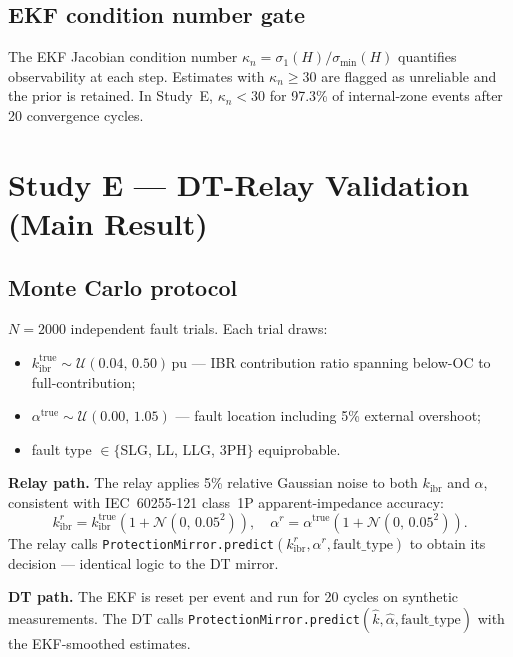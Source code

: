 \documentclass[11pt,a4paper]{article}
\newcommand{\kibr}{k_\mathrm{ibr}}
\newcommand{\kappan}{\kappa_n}
\begin{document}
\subsection{EKF condition number gate}

The EKF Jacobian condition number $\kappan = \sigma_1(H)/\sigma_{\min}(H)$
quantifies observability at each step.  Estimates with $\kappan \geq 30$ are
flagged as unreliable and the prior is retained.  In Study~E, $\kappan < 30$
for 97.3\% of internal-zone events after 20 convergence cycles.

\section{Study E --- DT-Relay Validation (Main Result)}
\label{sec:studyE}

\subsection{Monte Carlo protocol}

$N = 2000$ independent fault trials.  Each trial draws:
\begin{itemize}
  \item $\kibr^\mathrm{true} \sim \mathcal{U}(0.04,\, 0.50)$\,pu —
    IBR contribution ratio spanning below-OC to full-contribution;
  \item $\alpha^\mathrm{true} \sim \mathcal{U}(0.00,\, 1.05)$ —
    fault location including 5\% external overshoot;
  \item fault type $\in \{$SLG, LL, LLG, 3PH$\}$ equiprobable.
\end{itemize}

\noindent\textbf{Relay path.}
The relay applies 5\% relative Gaussian noise to both $\kibr$ and $\alpha$,
consistent with IEC~60255-121 class~1P apparent-impedance accuracy:
\begin{equation}
  \kibr^r = \kibr^\mathrm{true}(1 + \mathcal{N}(0,\,0.05^2)), \quad
  \alpha^r = \alpha^\mathrm{true}(1 + \mathcal{N}(0,\,0.05^2)).
\end{equation}
The relay calls \texttt{ProtectionMirror.predict}$(\kibr^r, \alpha^r,
\text{fault\_type})$ to obtain its decision — identical logic to the DT mirror.

\noindent\textbf{DT path.}
The EKF is reset per event and run for 20 cycles on synthetic measurements.
The DT calls \texttt{ProtectionMirror.predict}$(\hat{k}, \hat{\alpha},
\text{fault\_type})$ with the EKF-smoothed estimates.
\end{document}
